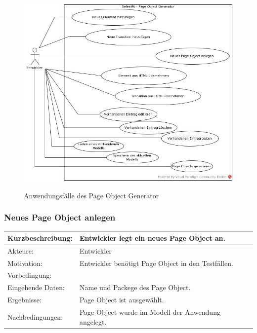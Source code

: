 \begin{figure}[htb]
  \centering  
  \includegraphics[scale=0.45]{img/Use-Cases.jpg}\\
  \caption{Anwendungsfälle des Page Object Generator}
  \label{fig:use_case}
\end{figure}

\subsubsection{Neues Page Object anlegen}
\label{sec:neues_page_object_anlegen}

\begin{tabular}[h]{|p{4cm}|p{}|}
\hline 
\rule[-1ex]{0pt}{2.5ex}Kurzbeschreibung: & 
Entwickler legt ein neues Page Object an. \\  
\hline 
\rule[-1ex]{0pt}{2.5ex}Akteure: & 
Entwickler \\ 
\hline 
\rule[-1ex]{0pt}{2.5ex}Motivation: & 
Entwickler benötigt Page Object in den Testfällen. \\ 
\hline 
\rule[-1ex]{0pt}{2.5ex}Vorbedingung: &  \\ 
\hline 
\rule[-1ex]{0pt}{2.5ex}Eingehende Daten: & Name und Packege des Page Object. \\ 
\hline 
\rule[-1ex]{0pt}{2.5ex}Ergebnisse: & Page Object ist ausgewählt. \\ 
\hline 
\rule[-1ex]{0pt}{2.5ex}Nachbedingungen: & Page Object wurde im Modell der Anwendung angelegt.  \\ 
\hline 
\end{tabular} 

